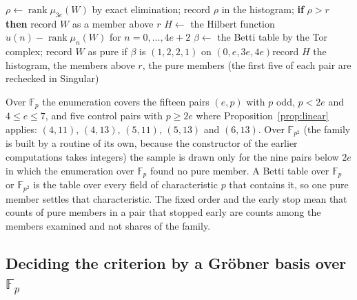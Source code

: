 \documentclass[11pt]{article}
\theoremstyle{definition}
\theoremstyle{remark}
\newcommand{\F}{\mathbb{F}}
\begin{document}
\begin{algorithm}[htbp]
\caption{The linear family over $\F_q$. Input: $e$, a prime power $q=p$ or $p^2$, a list of members $(a,b,c,d)\in\F_q^4$ (all of them over $\F_p$, or $20{,}000$ random ones over $\F_{p^2}$ with seed $20261120+$ the index of the pair), $r=2u(2e)-2$, the cap of $40$ pure members (family over $\F_p$) or $10$ (family over $\F_{p^2}$). Output: the histogram of $\operatorname{rank}\mu_{3e}$, the members above $r$, the pure members with their parameters.}
\label{alg:lf}
\begin{algorithmic}[1]
  \State $\rho\gets\operatorname{rank}\mu_{3e}(W)$ by exact elimination; record $\rho$ in the histogram; \textbf{if} $\rho>r$ \textbf{then} record $W$ as a member above $r$
\EndFor
{}
  \State $H\gets$ the Hilbert function $u(n)-\operatorname{rank}\mu_n(W)$ for $n=0,\dots,4e+2$
  \State $\beta\gets$ the Betti table by the Tor complex; record $W$ as pure if $\beta$ is $(1,2,2,1)$ on $(0,e,3e,4e)$\Else\State record $H$ \EndIf
\EndFor
\State \Return the histogram, the members above $r$, the pure members (the first five of each pair are rechecked in Singular)
\end{algorithmic}
\end{algorithm}

Over $\F_p$ the enumeration covers the fifteen pairs $(e,p)$ with $p$ odd, $p<2e$ and $4\le e\le7$, and five control pairs with $p\ge2e$ where Proposition~\ref{prop:linear} applies: $(4,11)$, $(4,13)$, $(5,11)$, $(5,13)$ and $(6,13)$. Over $\F_{p^2}$ (the family is built by a routine of its own, because the constructor of the earlier computations takes integers) the sample is drawn only for the nine pairs below $2e$ in which the enumeration over $\F_p$ found no pure member. A Betti table over $\F_p$ or $\F_{p^2}$ is the table over every field of characteristic $p$ that contains it, so one pure member settles that characteristic. The fixed order and the early stop mean that counts of pure members in a pair that stopped early are counts among the members examined and not shares of the family.

\subsection{Deciding the criterion by a Gr\"obner basis over \texorpdfstring{$\F_p$}{Fp}}
\label{sec:critmethods}
\end{document}
